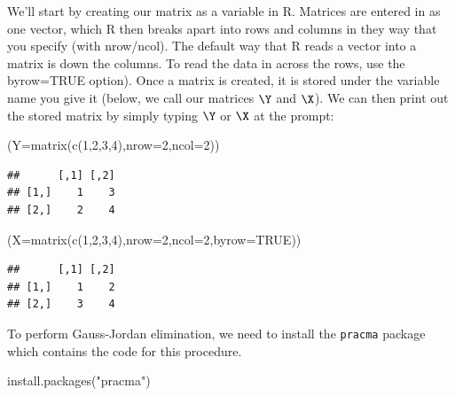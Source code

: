 \documentclass[
]{article}
\newenvironment{Shaded}{\begin{snugshade}}{\end{snugshade}}
\newcommand{\AttributeTok}[1]{\textcolor[rgb]{0.77,0.63,0.00}{#1}}
\newcommand{\ConstantTok}[1]{\textcolor[rgb]{0.00,0.00,0.00}{#1}}
\newcommand{\DecValTok}[1]{\textcolor[rgb]{0.00,0.00,0.81}{#1}}
\newcommand{\FunctionTok}[1]{\textcolor[rgb]{0.00,0.00,0.00}{#1}}
\newcommand{\NormalTok}[1]{#1}
\newcommand{\StringTok}[1]{\textcolor[rgb]{0.31,0.60,0.02}{#1}}
\theoremstyle{definition}
\theoremstyle{definition}
\theoremstyle{definition}
\theoremstyle{definition}
\theoremstyle{remark}
\begin{document}
We'll start by creating our matrix as a variable in R. Matrices are entered in as one vector, which R then breaks apart into rows and columns in they way that you specify (with nrow/ncol). The default way that R reads a vector into a matrix is down the columns. To read the data in across the rows, use the byrow=TRUE option). Once a matrix is created, it is stored under the variable name you give it (below, we call our matrices \(\Y\) and \(\X\)). We can then print out the stored matrix by simply typing \(\Y\) or \(\X\) at the prompt:

\begin{Shaded}
\begin{Highlighting}[]
\NormalTok{(}\AttributeTok{Y=}\FunctionTok{matrix}\NormalTok{(}\FunctionTok{c}\NormalTok{(}\DecValTok{1}\NormalTok{,}\DecValTok{2}\NormalTok{,}\DecValTok{3}\NormalTok{,}\DecValTok{4}\NormalTok{),}\AttributeTok{nrow=}\DecValTok{2}\NormalTok{,}\AttributeTok{ncol=}\DecValTok{2}\NormalTok{))}
\end{Highlighting}
\end{Shaded}

\begin{verbatim}
##      [,1] [,2]
## [1,]    1    3
## [2,]    2    4
\end{verbatim}

\begin{Shaded}
\begin{Highlighting}[]
\NormalTok{(}\AttributeTok{X=}\FunctionTok{matrix}\NormalTok{(}\FunctionTok{c}\NormalTok{(}\DecValTok{1}\NormalTok{,}\DecValTok{2}\NormalTok{,}\DecValTok{3}\NormalTok{,}\DecValTok{4}\NormalTok{),}\AttributeTok{nrow=}\DecValTok{2}\NormalTok{,}\AttributeTok{ncol=}\DecValTok{2}\NormalTok{,}\AttributeTok{byrow=}\ConstantTok{TRUE}\NormalTok{))}
\end{Highlighting}
\end{Shaded}

\begin{verbatim}
##      [,1] [,2]
## [1,]    1    2
## [2,]    3    4
\end{verbatim}

To perform Gauss-Jordan elimination, we need to install the \texttt{pracma} package which contains the code for this procedure.

\begin{Shaded}
\begin{Highlighting}[]
\FunctionTok{install.packages}\NormalTok{(}\StringTok{"pracma"}\NormalTok{)}
\end{Highlighting}
\end{Shaded}
\end{document}
